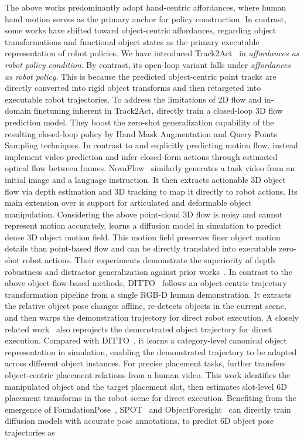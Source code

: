 \documentclass[Afour,sageh,times]{sagej}
\begin{document}
The above works predominantly adopt hand-centric affordances, where human hand motion serves as the primary anchor for policy construction. In contrast, some works have shifted toward object-centric affordances, regarding object transformations and functional object states as the primary executable representation of robot policies. We have introduced Track2Act~\citep{bharadhwaj2024track2act} in \textit{affordances as robot policy condition}. By contrast, its open-loop variant falls under \textit{affordances as robot policy}. This is because the predicted object-centric point tracks are directly converted into rigid object transforms and then retargeted into executable robot trajectories. To address the limitations of 2D flow and in-domain finetuning inherent in Track2Act, \cite{yuan2024general} directly train a closed-loop 3D flow prediction model. They boost the zero-shot generalization capability of the resulting closed-loop policy by Hand Mask Augmentation and Query Points Sampling techniques. In contrast to \cite{bharadhwaj2024track2act} and \cite{yuan2024general} explicitly predicting motion flow, \cite{ko2023learning} instead implement video prediction and infer closed-form actions through estimated optical flow between frames. NovaFlow~\citep{li2025novaflow} similarly generates a task video from an initial image and a language instruction. It then extracts actionable 3D object flow via depth estimation and 3D tracking to map it directly to robot actions. Its main extension over \cite{ko2023learning} is support for articulated and deformable object manipulation. Considering the above point-cloud 3D flow is noisy and cannot represent motion accurately, \cite{yin2025object} learns a diffusion model in simulation to predict dense 3D object motion field. This motion field preserves finer object motion details than point-based flow and can be directly translated into executable zero-shot robot actions. Their experiments demonstrate the superiority of depth robustness and distractor generalization against prior works~\citep{bharadhwaj2024track2act,yuan2024general}. In contrast to the above object-flow-based methods, DITTO~\citep{heppert2024ditto} follows an object-centric trajectory transformation pipeline from a single RGB-D human demonstration. It extracts the relative object pose changes offline, re-detects objects in the current scene, and then warps the demonstration trajectory for direct robot execution. A closely related work~\citep{wen2022you} also reprojects the demonstrated object trajectory for direct execution. Compared with DITTO~\citep{heppert2024ditto}, it learns a category-level canonical object representation in simulation, enabling the demonstrated trajectory to be adapted across different object instances. For precise placement tasks, \cite{shan2025slot} further transfers object-centric placement relations from a human video. This work identifies the manipulated object and the target placement slot, then estimates slot-level 6D placement transforms in the robot scene for direct execution. Benefiting from the emergence of FoundationPose~\citep{wen2024foundationpose}, SPOT~\citep{hsu2025spot} and ObjectForesight~\citep{soraki2026objectforesight} can directly train diffusion models with accurate pose annotations, to predict 6D object pose trajectories as 
\end{document}

